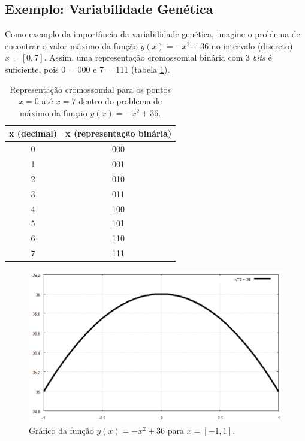 	\subsection{\label{ExemploVariabilidade}Exemplo: Variabilidade Genética}
	
	Como exemplo da importância da variabilidade genética, imagine o problema de encontrar o valor máximo da função $y(x) = -x^2 + 36$ no intervalo (discreto) $x = [0,7]$. Assim, uma representação cromossomial binária com 3 \textit{bits} é suficiente, pois 0 = 000 e 7 = 111 (tabela \ref{tabRepCroX2}).
	
	\begin{table}[htp]
 		\caption{\label{tabRepCroX2}Representação cromossomial para os pontos $x = 0$ até $x = 7$ dentro do problema de máximo da função $y(x) = -x^2 + 36$.}
 		\begin{center}
  		\begin{tabular}{cc}
   			\hline
   			\textbf{x (decimal)}  & \textbf{x (representação binária)} \\
   			\hline
   			0 & 000 \\
   			1 & 001 \\
   			2 & 010 \\ 
   			3 & 011 \\
   			4 & 100 \\
   			5 & 101 \\ 
   			6 & 110 \\
   			7 & 111	\\
   			\hline
   		\end{tabular}
 		\end{center}
	\end{table}
	
	\begin{figure}[htp]
		\begin{center}
			\includegraphics[width=13cm]{figs/ga/Parabola.png}
		\end{center}
		\caption{\label{figParabola}Gráfico da função $y(x) = -x^2 + 36$ para $x = [-1,1]$.}
	\end{figure}
	
